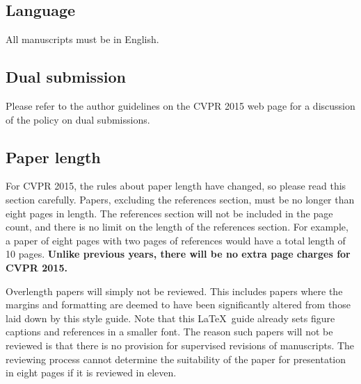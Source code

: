 \documentclass[10pt,twocolumn,letterpaper]{article}
\begin{document}
\iffalse
\subsection{Language}

All manuscripts must be in English.

\subsection{Dual submission}

Please refer to the author guidelines on the CVPR 2015 web page for a
discussion of the policy on dual submissions.

\subsection{Paper length}
For CVPR 2015, the rules about paper length have changed, so please
read this section carefully. Papers, excluding the references section,
must be no longer than eight pages in length. The references section
will not be included in the page count, and there is no limit on the
length of the references section. For example, a paper of eight pages
with two pages of references would have a total length of 10 pages.
{\bf Unlike previous years, there will be no extra page charges for
  CVPR 2015.}

Overlength papers will simply not be reviewed.  This includes papers
where the margins and formatting are deemed to have been significantly
altered from those laid down by this style guide.  Note that this
\LaTeX\ guide already sets figure captions and references in a smaller font.
The reason such papers will not be reviewed is that there is no provision for
supervised revisions of manuscripts.  The reviewing process cannot determine
the suitability of the paper for presentation in eight pages if it is
reviewed in eleven.  

\end{document}
